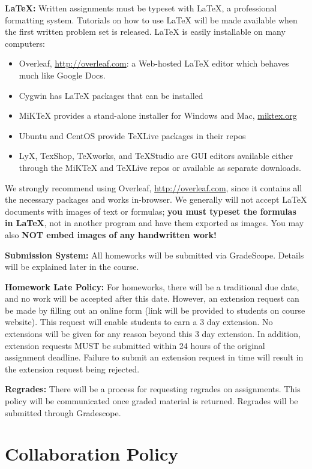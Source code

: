 \documentclass[12pt]{article}
\begin{document}
\textbf{\LaTeX:} Written assignments must be typeset with \LaTeX, a professional formatting system. Tutorials on how to use \LaTeX{} will be made available when the first written problem set is released. \LaTeX{} is easily installable on many computers: 
\begin{itemize}
    \item Overleaf, \url{http://overleaf.com}: a Web-hosted \LaTeX{} editor which behaves much like Google Docs.
    \item Cygwin has \LaTeX{} packages that can be installed
    \item MiKTeX provides a stand-alone installer for Windows and Mac, \url{miktex.org}
    \item Ubuntu and CentOS provide TeXLive packages in their repos
    \item LyX, TexShop, TeXworks, and TeXStudio are GUI editors available either through the MiKTeX and TeXLive repos or available as separate downloads.
\end{itemize}
We strongly recommend using Overleaf, \url{http://overleaf.com}, since it contains all the necessary packages and works in-browser. We generally will not accept \LaTeX{} documents with images of text or formulas; \textbf{you must typeset the formulas in \LaTeX}, not in another program and have them exported as images. You may also \textbf{NOT embed images of any handwritten work!}

\textbf{Submission System:} All homeworks will be submitted via GradeScope. Details will be explained later in the course. 

\textbf{Homework Late Policy:} For homeworks, there will be a traditional due date, and no work will be accepted after this date. However, an extension request can be made by filling out an online form (link will be provided to students on course website). This request will enable students to earn a 3 day extension. No extensions will be given for any reason beyond this 3 day extension. In addition, extension requests MUST be submitted within 24 hours of the original assignment deadline. Failure to submit an extension request in time will result in the extension request being rejected.

\textbf{Regrades:} There will be a process for requesting regrades on assignments. This policy will be communicated once graded material is returned. Regrades will be submitted through Gradescope.

\section*{Collaboration Policy}
\end{document}
